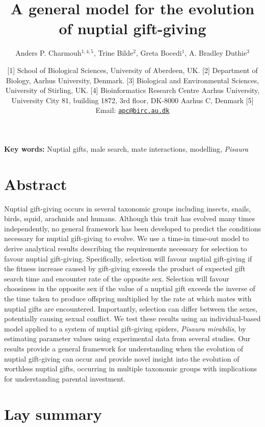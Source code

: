 \documentclass[
]{article}
\title{A general model for the evolution of nuptial gift-giving}
\author{Anders P. Charmouh\(^{1,4, 5}\), Trine Bilde\(^{2}\), Greta
Bocedi\(^{1}\), A. Bradley Duthie\(^{3}\)}
\date{{[}1{]} School of Biological Sciences, University of Aberdeen, UK.
{[}2{]} Department of Biology, Aarhus University, Denmark. {[}3{]}
Biological and Environmental Sciences, University of Stirling, UK.
{[}4{]} Bioinformatics Research Centre Aarhus University, University
City 81, building 1872, 3rd floor, DK-8000 Aarhus C, Denmark {[}5{]}
Email: \href{mailto:apc@birc.au.dk}{\nolinkurl{apc@birc.au.dk}}}
\begin{document}
\maketitle

\textbf{Key words:} Nuptial gifts, male search, mate interactions,
modelling, \emph{Pisaura}

\hypertarget{abstract}{%
\section{Abstract}\label{abstract}}

Nuptial gift-giving occurs in several taxonomic groups including
insects, snails, birds, squid, arachnids and humans. Although this trait
has evolved many times independently, no general framework has been
developed to predict the conditions necessary for nuptial gift-giving to
evolve. We use a time-in time-out model to derive analytical results
describing the requirements necessary for selection to favour nuptial
gift-giving. Specifically, selection will favour nuptial gift-giving if
the fitness increase caused by gift-giving exceeds the product of
expected gift search time and encounter rate of the opposite sex.
Selection will favour choosiness in the opposite sex if the value of a
nuptial gift exceeds the inverse of the time taken to produce offspring
multiplied by the rate at which mates with nuptial gifts are
encountered. Importantly, selection can differ between the sexes,
potentially causing sexual conflict. We test these results using an
individual-based model applied to a system of nuptial gift-giving
spiders, \emph{Pisaura mirabilis}, by estimating parameter values using
experimental data from several studies. Our results provide a general
framework for understanding when the evolution of nuptial gift-giving
can occur and provide novel insight into the evolution of worthless
nuptial gifts, occurring in multiple taxonomic groups with implications
for understanding parental investment.

\hypertarget{lay-summary}{%
\section{Lay summary}\label{lay-summary}}
\end{document}
